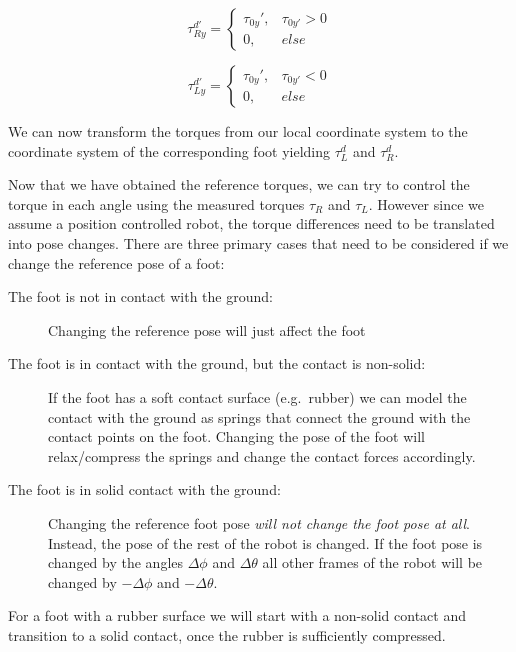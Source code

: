 \documentclass[english,ngerman]{KITreprt}
\begin{document}
\begin{equation} \label{eq:torque-right-x}
\tau^{d'}_{Ry} = \left\{
\begin{array}{lr}
\tau_{0y}', & \tau_{0y'} > 0 \\
0, & else
\end{array}
\right.
\end{equation}

\begin{equation} \label{eq:torque-left-x}
\tau^{d'}_{Ly} = \left\{
\begin{array}{lr}
\tau_{0y}', & \tau_{0y'} < 0 \\
0, & else
\end{array}
\right.
\end{equation}

We can now transform the torques from our local coordinate system to the
coordinate system of the corresponding foot yielding $\tau^d_L$ and
$\tau^d_R$.

Now that we have obtained the reference torques, we can try to control
the torque in each angle using the measured torques $\tau_R$ and
$\tau_L$. However since we assume a position controlled robot, the
torque differences need to be translated into pose changes. There are
three primary cases that need to be considered if we change the
reference pose of a foot:

\begin{description}
\item[The foot is not in contact with the ground:]
Changing the reference pose will just affect the foot
\item[The foot is in contact with the ground, but the contact is
non-solid:]
If the foot has a soft contact surface (e.g.~rubber) we can model the
contact with the ground as springs that connect the ground with the
contact points on the foot. Changing the pose of the foot will
relax/compress the springs and change the contact forces accordingly.
\item[The foot is in solid contact with the ground:]
Changing the reference foot pose \emph{will not change the foot pose at
all}. Instead, the pose of the rest of the robot is changed. If the foot
pose is changed by the angles $\Delta \phi$ and $\Delta \theta$ all
other frames of the robot will be changed by $-\Delta \phi$ and
$-\Delta \theta$.
\end{description}

For a foot with a rubber surface we will start with a non-solid contact
and transition to a solid contact, once the rubber is sufficiently
compressed. \cite{kajita2005running}
\end{document}
